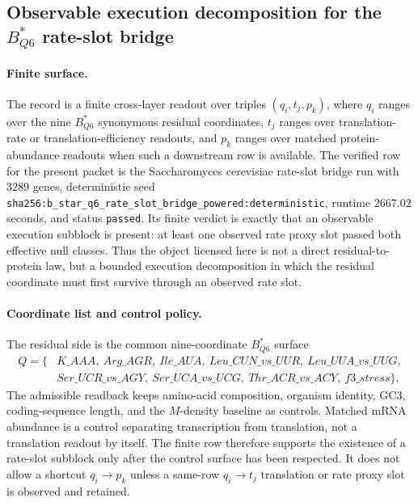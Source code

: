 
\subsection{Observable execution decomposition for the $B^{\ast}_{Q6}$ rate-slot bridge}
\label{sec:bioreality-observable-execution-decomposition-b-star-q6-rate-slot-bridge}

\paragraph{Finite surface.}
The record is a finite cross-layer readout over triples $(q_i,t_j,p_k)$, where $q_i$ ranges over the nine $B^{\ast}_{Q6}$ synonymous residual coordinates, $t_j$ ranges over translation-rate or translation-efficiency readouts, and $p_k$ ranges over matched protein-abundance readouts when such a downstream row is available. The verified row for the present packet is the Saccharomyces cerevisiae rate-slot bridge run with $3289$ genes, deterministic seed \texttt{sha256:b\_star\_q6\_rate\_slot\_bridge\_powered:deterministic}, runtime $2667.02$ seconds, and status \texttt{passed}. Its finite verdict is exactly that an observable execution subblock is present: at least one observed rate proxy slot passed both effective null classes. Thus the object licensed here is not a direct residual-to-protein law, but a bounded execution decomposition in which the residual coordinate must first survive through an observed rate slot.

\paragraph{Coordinate list and control policy.}
The residual side is the common nine-coordinate $B^{\ast}_{Q6}$ surface
$$
\begin{aligned}
Q=\{&K\_AAA,\ Arg\_AGR,\ Ile\_AUA,\ Leu\_CUN\_vs\_UUR,\ Leu\_UUA\_vs\_UUG,\\
&Ser\_UCR\_vs\_AGY,\ Ser\_UCA\_vs\_UCG,\ Thr\_ACR\_vs\_ACY,\ f3\_stress\}.
\end{aligned}
$$
The admissible readback keeps amino-acid composition, organism identity, GC3, coding-sequence length, and the $M$-density baseline as controls. Matched mRNA abundance is a control separating transcription from translation, not a translation readout by itself. The finite row therefore supports the existence of a rate-slot subblock only after the control surface has been respected. It does not allow a shortcut $q_i\to p_k$ unless a same-row $q_i\to t_j$ translation or rate proxy slot is observed and retained.

